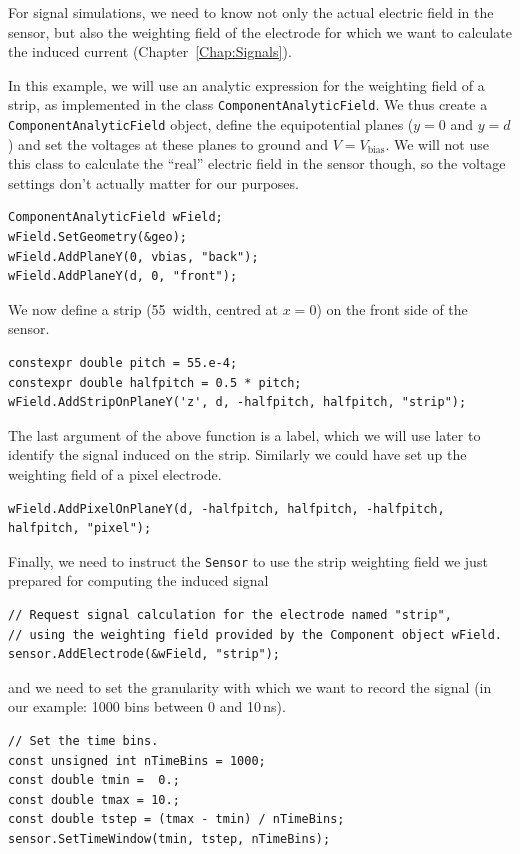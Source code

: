 For signal simulations, 
we need to know not only the actual electric field in the sensor, 
but also the weighting field of the electrode for which we want to 
calculate the induced current (Chapter~\ref{Chap:Signals}).

In this example, 
we will use an analytic expression for the weighting field of a strip, 
as implemented in the class \texttt{ComponentAnalyticField}. 
We thus create a \texttt{ComponentAnalyticField} object, 
define the equipotential planes ($y = 0$ and $y = d$) 
and set the voltages at these planes to ground and $V = V_{\text{bias}}$. 
We will not use this class to calculate the ``real'' electric field 
in the sensor though, so the voltage settings don't actually matter 
for our purposes.
\begin{lstlisting}
ComponentAnalyticField wField;
wField.SetGeometry(&geo);
wField.AddPlaneY(0, vbias, "back");
wField.AddPlaneY(d, 0, "front");
\end{lstlisting}
We now define a strip (55\, width, centred at $x = 0$) 
on the front side of the sensor.
\begin{lstlisting}
constexpr double pitch = 55.e-4;
constexpr double halfpitch = 0.5 * pitch;
wField.AddStripOnPlaneY('z', d, -halfpitch, halfpitch, "strip");
\end{lstlisting}
The last argument of the above function is a label, which we will use 
later to identify the signal induced on the strip.
Similarly we could have set up the weighting field of a pixel electrode.
\begin{lstlisting}
wField.AddPixelOnPlaneY(d, -halfpitch, halfpitch, -halfpitch, halfpitch, "pixel");
\end{lstlisting}

Finally, we need to instruct the \texttt{Sensor} 
to use the strip weighting field we just prepared 
for computing the induced signal
\begin{lstlisting}
// Request signal calculation for the electrode named "strip",
// using the weighting field provided by the Component object wField.
sensor.AddElectrode(&wField, "strip");
\end{lstlisting}
and we need to set the granularity with which we want to record the signal 
(in our example: 1000 bins between 0 and 10\,ns).

\begin{lstlisting}
// Set the time bins.
const unsigned int nTimeBins = 1000;
const double tmin =  0.;
const double tmax = 10.;
const double tstep = (tmax - tmin) / nTimeBins;
sensor.SetTimeWindow(tmin, tstep, nTimeBins);
\end{lstlisting}

